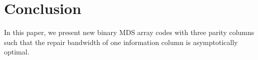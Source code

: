 \documentclass[conference]{IEEEtran}
\begin{document}











\section{Conclusion}
\label{sec:con}
In this paper, we present new binary MDS array codes with three parity columns such that the repair bandwidth of one information column is asymptotically optimal. 
\end{document}
